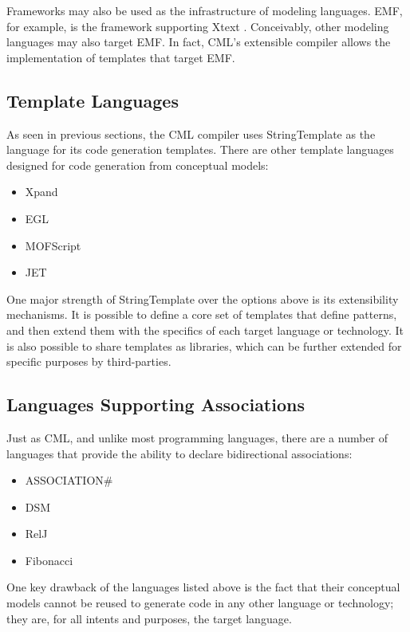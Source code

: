 Frameworks may also be used as the infrastructure of modeling languages.
EMF, for example, is the framework supporting Xtext \cite{xtext}.
Conceivably, other modeling languages may also target EMF.
In fact, CML's extensible compiler allows the implementation of templates that target EMF.

\subsection{Template Languages}

As seen in previous sections,
the CML compiler uses StringTemplate as the language for its code generation templates.
There are other template languages designed for code generation from conceptual models:

\begin{itemize}
\item Xpand \cite{xpand}
\item EGL \cite{egl}
\item MOFScript \cite{mofscript}
\item JET \cite{jet}
\end{itemize}

One major strength of StringTemplate over the options above is its extensibility mechanisms.
It is possible to define a core set of templates that define patterns, 
and then extend them with the specifics of each target language or technology.
It is also possible to share templates as libraries,
which can be further extended for specific purposes by third-parties.

\subsection{Languages Supporting Associations}

Just as CML,
and unlike most programming languages,
there are a number of languages that provide the ability to declare bidirectional associations:

\begin{itemize}
\item ASSOCIATION\# \cite{cardoso}
\item DSM \cite{balzer}
\item RelJ \cite{bierman}
\item Fibonacci \cite{fibonacci}
\end{itemize}

One key drawback of the languages listed above is the fact that their conceptual models
cannot be reused to generate code in any other language or technology;
they are, for all intents and purposes, the target language.

